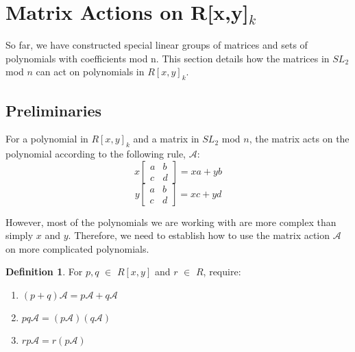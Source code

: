 \documentclass[a4paper,draft]{amsproc}
\theoremstyle{plain}
\theoremstyle{definition}
\newtheorem{dfn}{Definition}[section]
\theoremstyle{remark}
\numberwithin{equation}{section}
\begin{document}
\section{Matrix Actions on R[x,y]$_{k}$} 
So far, we have constructed special linear groups of matrices and sets of polynomials with coefficients mod n. This section details how the matrices in $SL_{2}$ mod $n$ can act on polynomials in $R[x,y]_{k}$. 

\subsection{Preliminaries}
For a polynomial in $R[x,y]_{k}$ and a matrix in $SL_{2}$ mod $n$, the matrix acts on the polynomial according to the following rule, $\mathcal{A}$: 
$$
x\begin{bmatrix}
 a&b \\ 
 c&d 
\end{bmatrix} = xa + yb 
$$
$$
y\begin{bmatrix}
 a&b \\ 
 c&d 
\end{bmatrix} = xc + yd 
$$

However, most of the polynomials we are working with are more complex than simply $x$ and $y$. Therefore, we need to establish how to use the matrix action $\mathcal{A}$ on more complicated polynomials. 
\begin{dfn}
For $p, q$ $\in$ $R[x,y]$ and $r$ $\in$ $R$, require: 
\begin{enumerate}
\item $(p+q)\mathcal{A} = p\mathcal{A} + q\mathcal{A}$
\item $pq\mathcal{A} = (p\mathcal{A})(q\mathcal{A})$
\item $rp\mathcal{A} = r(p\mathcal{A})$
\end{enumerate}
\end{dfn}
\end{document}

